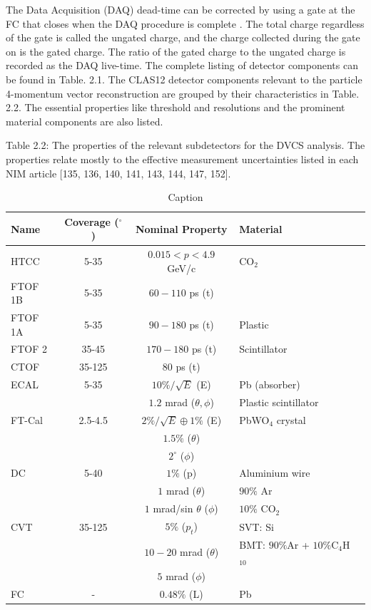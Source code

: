     
    The Data Acquisition (DAQ) \parencite{Boyarinov2020TheSystem} dead-time can be corrected by using a gate at the FC that closes when the DAQ procedure is complete \parencite{Baltzell2020ThePerformance}. The total charge regardless of the gate is called the ungated charge, and the charge collected during the gate on is the gated charge. The ratio of the gated charge to the ungated charge is recorded as the DAQ live-time. The complete listing of detector components can be found in Table. 2.1. The CLAS12 detector components relevant to the particle 4-momentum vector reconstruction are grouped by their characteristics in Table. 2.2. The essential properties like threshold and resolutions and the prominent material components are also listed. 



    Table 2.2: The properties of the relevant subdetectors for the DVCS analysis. The
    properties relate mostly to the effective measurement uncertainties listed in each NIM
    article [135, 136, 140, 141, 143, 144, 147, 152].
    
    \begin{table}[ht]
        \centering
        \begin{tabularx}{\textwidth}{XccXX}
        \toprule
        Name & Coverage ($^\circ$) & Nominal Property & Material \\
        \midrule
        HTCC & 5-35 & $0.015 < p < 4.9$ GeV/c & CO$_2$ \\
        FTOF 1B & 5-35 & $60 - 110$ ps (t) & \\
        FTOF 1A & 5-35 & $90 - 180$ ps (t) & Plastic \\
        FTOF 2 & 35-45 & $170 - 180$ ps (t) & Scintillator \\
        CTOF & 35-125 & $80$ ps (t) & \\
        ECAL & 5-35 & $10\%/\sqrt{E}$ (E) & Pb (absorber) \\
        & & $1.2$ mrad ($\theta, \phi$) & Plastic scintillator \\
        FT-Cal & 2.5-4.5 & $2\%/\sqrt{E} \oplus 1\%$ (E) & PbWO$_4$ crystal \\
        & & $1.5\%$ ($\theta$) & \\
        & & $2^\circ$ ($\phi$) & \\
        DC & 5-40 & $1\%$ (p) & Aluminium wire \\
        & & $1$ mrad ($\theta$) & $90\%$ Ar \\
        & & $1$ mrad/sin $\theta$ ($\phi$) & $10\%$ CO$_2$ \\
        CVT & 35-125 & $5\%$ ($p_t$) & SVT: Si \\
        & & $10 - 20$ mrad ($\theta$) & BMT: $90\%$Ar + $10\%$C$_4$H$_{10}$ \\
        & & $5$ mrad ($\phi$) & \\
        FC & - & $0.48\%$ (L) & Pb \\
        \bottomrule
        \end{tabularx}
        \caption{Caption}
        \label{tab:my_label}
    \end{table}


\fi

